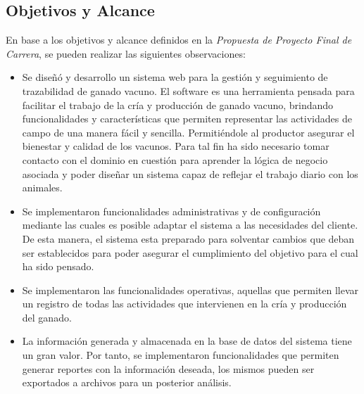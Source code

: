 \documentclass[11pt,oneside]{book}
\begin{document}
\subsection{Objetivos y Alcance}
En base a los objetivos y alcance definidos en la \textit{Propuesta de Proyecto Final de Carrera}, se pueden realizar las siguientes observaciones:
\begin{itemize}
\item Se diseñó y desarrollo un sistema web para la gestión y seguimiento de trazabilidad de ganado vacuno. El software es una herramienta pensada para facilitar el trabajo de la cría y producción de ganado vacuno, brindando funcionalidades y características que permiten representar las actividades de campo de una manera fácil y sencilla. Permitiéndole al productor asegurar el bienestar y calidad de los vacunos. Para tal fin ha sido necesario tomar contacto con el dominio en cuestión para aprender la lógica de negocio asociada y poder diseñar un sistema capaz de reflejar el trabajo diario con los animales.
\item Se implementaron funcionalidades administrativas y de configuración mediante las cuales es posible adaptar el sistema a las necesidades del cliente. De esta manera, el sistema esta preparado para solventar cambios que deban ser establecidos para poder asegurar el cumplimiento del objetivo para el cual ha sido pensado.
\newpage
\item Se implementaron las funcionalidades operativas, aquellas que permiten llevar un registro de todas las actividades que intervienen en la cría y producción del ganado.
\item La información generada y almacenada en la base de datos del sistema tiene un gran valor. Por tanto, se implementaron funcionalidades que permiten generar reportes con la información deseada, los mismos pueden ser exportados a archivos para un posterior análisis.
\end{itemize}
\end{document}
